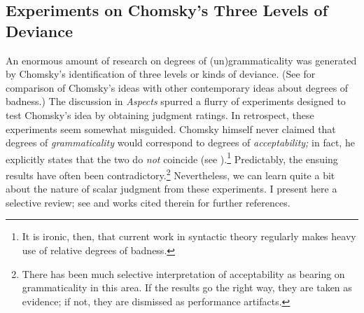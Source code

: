 \subsection{Experiments on Chomsky's Three Levels of Deviance}\label{sec:3.3.2}

An enormous amount of research on degrees of (un)grammaticality was generated by Chomsky's identification of three levels or kinds of deviance. (See \citet{Schnitser1973} for comparison of Chomsky's ideas with other contemporary ideas about degrees of badness.) The discussion in \textit{Aspects} spurred a flurry of experiments designed to test Chomsky's idea by obtaining judgment ratings. In retrospect, these experiments seem somewhat misguided. Chomsky himself never claimed that degrees of \textit{grammaticality} would correspond to degrees of \textit{acceptability;} in fact, he explicitly states that the two do \textit{not} coincide (see ).\footnote{It is ironic, then, that current work in syntactic theory regularly makes heavy use of relative degrees of badness.}
 Predictably, the ensuing results have often been contradictory.\footnote{There has been much selective interpretation of acceptability as bearing on grammaticality in this area. If the results go the right way, they are taken as evidence; if not, they are dismissed as performance artifacts.}
 Nevertheless, we can learn quite a bit about the nature of scalar judgment from these experiments. I present here a selective review; see \citet{Moore1972} and works cited therein for further references.
 


